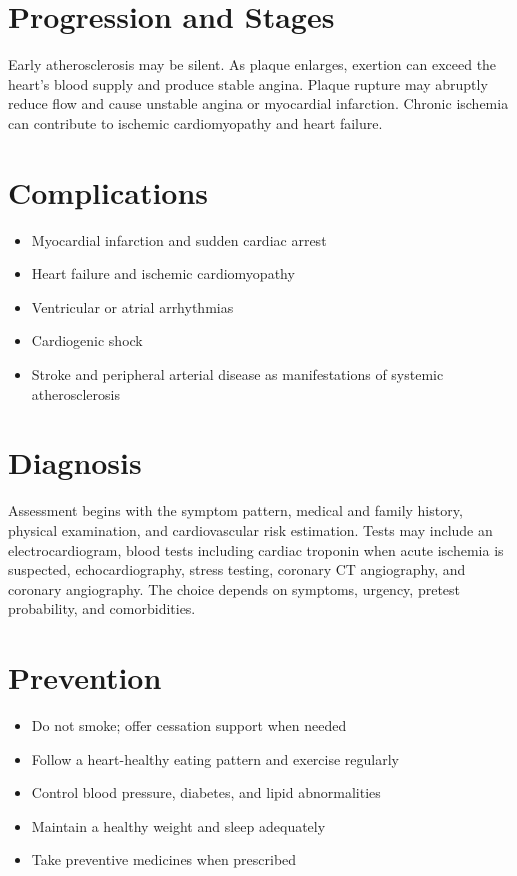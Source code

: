 \section{Progression and Stages}
Early atherosclerosis may be silent. As plaque enlarges, exertion can exceed the heart's blood supply and produce stable angina. Plaque rupture may abruptly reduce flow and cause unstable angina or myocardial infarction. Chronic ischemia can contribute to ischemic cardiomyopathy and heart failure.
\section{Complications}
\begin{itemize}[noitemsep]
  \item Myocardial infarction and sudden cardiac arrest
  \item Heart failure and ischemic cardiomyopathy
  \item Ventricular or atrial arrhythmias
  \item Cardiogenic shock
  \item Stroke and peripheral arterial disease as manifestations of systemic atherosclerosis
\end{itemize}
\section{Diagnosis}
Assessment begins with the symptom pattern, medical and family history, physical examination, and cardiovascular risk estimation. Tests may include an electrocardiogram, blood tests including cardiac troponin when acute ischemia is suspected, echocardiography, stress testing, coronary CT angiography, and coronary angiography. The choice depends on symptoms, urgency, pretest probability, and comorbidities.
\section{Prevention}
\begin{itemize}[noitemsep]
  \item Do not smoke; offer cessation support when needed
  \item Follow a heart-healthy eating pattern and exercise regularly
  \item Control blood pressure, diabetes, and lipid abnormalities
  \item Maintain a healthy weight and sleep adequately
  \item Take preventive medicines when prescribed
\end{itemize}
